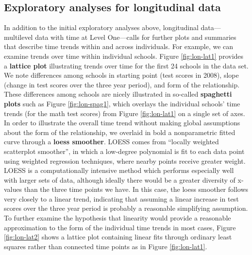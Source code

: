 \documentclass[
]{krantz}
\begin{document}
\hypertarget{longitudinalanalyses}{%
\subsection{Exploratory analyses for longitudinal data}\label{longitudinalanalyses}}

In addition to the initial exploratory analyses above, longitudinal data---multilevel data with time at Level One---calls for further plots and summaries that describe time trends within and across individuals. For example, we can examine trends over time within individual schools. Figure \ref{fig:lon-lat1} provides a \textbf{lattice plot}  illustrating trends over time for the first 24 schools in the data set. We note differences among schools in starting point (test scores in 2008), slope (change in test scores over the three year period), and form of the relationship. These differences among schools are nicely illustrated in so-called \textbf{spaghetti plots}  such as Figure \ref{fig:lon-spag1}, which overlays the individual schools' time trends (for the math test scores) from Figure \ref{fig:lon-lat1} on a single set of axes. In order to illustrate the overall time trend without making global assumptions about the form of the relationship, we overlaid in bold a nonparametric fitted curve through a \textbf{loess smoother}.  LOESS comes from ``locally weighted scatterplot smoother'', in which a low-degree polynomial is fit to each data point using weighted regression techniques, where nearby points receive greater weight. LOESS is a computationally intensive method which performs especially well with larger sets of data, although ideally there would be a greater diversity of x-values than the three time points we have. In this case, the loess smoother follows very closely to a linear trend, indicating that assuming a linear increase in test scores over the three year period is probably a reasonable simplifying assumption. To further examine the hypothesis that linearity would provide a reasonable approximation to the form of the individual time trends in most cases, Figure \ref{fig:lon-lat2} shows a lattice plot containing linear fits through ordinary least squares rather than connected time points as in Figure \ref{fig:lon-lat1}.
\end{document}
